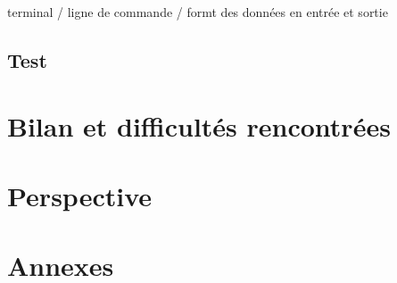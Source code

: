 \documentclass[oneside,13pt,a4paper]{report}
\begin{document}
            terminal / ligne de commande / formt des données en entrée et sortie

        \section{Test}



    \chapter{Bilan et difficultés rencontrées}


    \chapter{Perspective}


    \chapter{Annexes}
\end{document}
